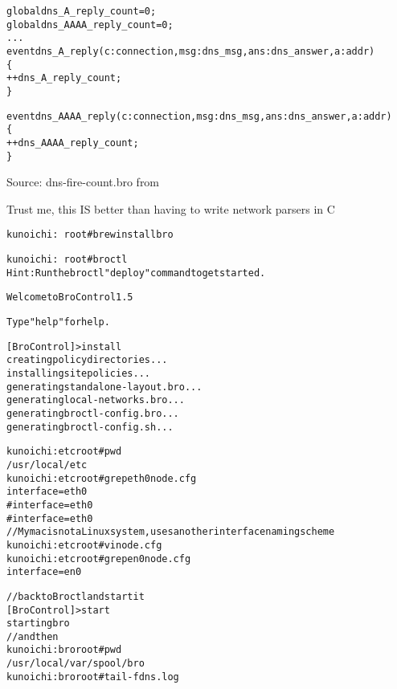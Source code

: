 \documentclass[20pt,landscape,a4paper,footrule]{foils}
\begin{document}

\begin{alltt}\small
global dns_A_reply_count=0;
global dns_AAAA_reply_count=0;
...
event dns_A_reply(c: connection, msg: dns_msg, ans: dns_answer, a: addr)
	\{
	++dns_A_reply_count;
	\}

event dns_AAAA_reply(c: connection, msg: dns_msg, ans: dns_answer, a: addr)
	\{
	++dns_AAAA_reply_count;
	\}
\end{alltt}

Source: dns-fire-count.bro from\\
{\small {}}

Trust me, this IS better than having to write network parsers in C \smiley




\begin{alltt}\small
kunoichi:~ root# brew install bro

kunoichi:~ root# broctl
Hint: Run the broctl "deploy" command to get started.

Welcome to BroControl 1.5

Type "help" for help.

[BroControl] > install
creating policy directories ...
installing site policies ...
generating standalone-layout.bro ...
generating local-networks.bro ...
generating broctl-config.bro ...
generating broctl-config.sh ...
\end{alltt}


\begin{alltt}\small
kunoichi:etc root# pwd
/usr/local/etc
kunoichi:etc root# grep eth0 node.cfg
interface=eth0
#interface=eth0
#interface=eth0
// My mac is not a Linux system, uses another interface naming scheme
kunoichi:etc root# vi node.cfg
kunoichi:etc root# grep en0 node.cfg
interface=en0
\end{alltt}


\begin{alltt}\small
// back to Broctl and start it
[BroControl] > start
starting bro
// and then
kunoichi:bro root# pwd
/usr/local/var/spool/bro
kunoichi:bro root# tail -f dns.log
\end{alltt}
\end{document}
